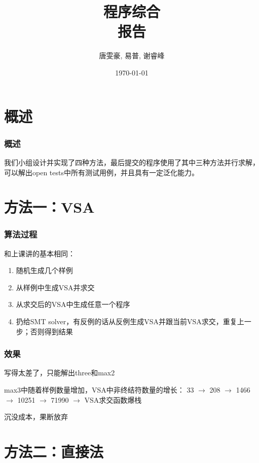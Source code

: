\documentclass[notheorems]{beamer} %
\title{程序综合\\ 报告}
\author{唐雯豪, 易普, 谢睿峰}
\institute{EECS, PKU}
\date{\today}
\begin{document}
  \maketitle

  \section{概述}
  \begin{frame}
    \frametitle{概述}
    我们小组设计并实现了四种方法，最后提交的程序使用了其中三种方法并行求解，可以解出open tests中所有测试用例，并且具有一定泛化能力。
  \end{frame}
  
  \section{方法一：VSA}
  \begin{frame}
    \frametitle{算法过程}
    和上课讲的基本相同：
    \begin{enumerate}
      \item 随机生成几个样例
      \item 从样例中生成VSA并求交
      \item 从求交后的VSA中生成任意一个程序
      \item 扔给SMT solver，有反例的话从反例生成VSA并跟当前VSA求交，重复上一步；否则得到结果
    \end{enumerate}
  \end{frame}
  \begin{frame}
    \frametitle{效果}
    写得太差了，只能解出three和max2

    max3中随着样例数量增加，VSA中非终结符数量的增长：
    33 $\to$ 208 $\to$ 1466 $\to$  10251 $\to$  71990 $\to$ VSA求交函数爆栈

    沉没成本，果断放弃
  \end{frame}
  \section{方法二：直接法}
\end{document}
